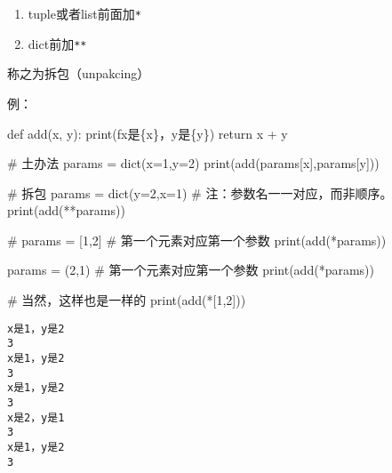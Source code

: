 \documentclass[
  letterpaper,
  DIV=11,
  numbers=noendperiod]{scrreprt}
\newenvironment{Shaded}{\begin{snugshade}}{\end{snugshade}}
\newcommand{\BuiltInTok}[1]{\textcolor[rgb]{0.00,0.23,0.31}{#1}}
\newcommand{\CommentTok}[1]{\textcolor[rgb]{0.37,0.37,0.37}{#1}}
\newcommand{\ControlFlowTok}[1]{\textcolor[rgb]{0.00,0.23,0.31}{#1}}
\newcommand{\DecValTok}[1]{\textcolor[rgb]{0.68,0.00,0.00}{#1}}
\newcommand{\KeywordTok}[1]{\textcolor[rgb]{0.00,0.23,0.31}{#1}}
\newcommand{\NormalTok}[1]{\textcolor[rgb]{0.00,0.23,0.31}{#1}}
\newcommand{\OperatorTok}[1]{\textcolor[rgb]{0.37,0.37,0.37}{#1}}
\newcommand{\SpecialCharTok}[1]{\textcolor[rgb]{0.37,0.37,0.37}{#1}}
\newcommand{\SpecialStringTok}[1]{\textcolor[rgb]{0.13,0.47,0.30}{#1}}
\newcommand{\StringTok}[1]{\textcolor[rgb]{0.13,0.47,0.30}{#1}}
\providecommand{\tightlist}{%
  \setlength{\itemsep}{0pt}\setlength{\parskip}{0pt}}\usepackage{longtable,booktabs,array}
\begin{document}
\begin{enumerate}
\def\labelenumi{\arabic{enumi}.}
\tightlist
\item
  tuple或者list前面加\texttt{*}
\item
  dict前加\texttt{**}
\end{enumerate}

称之为拆包（unpakcing）

例：

\begin{Shaded}
\begin{Highlighting}[]
\KeywordTok{def}\NormalTok{ add(x, y): }
    \BuiltInTok{print}\NormalTok{(}\SpecialStringTok{f\textquotesingle{}x是}\SpecialCharTok{\{}\NormalTok{x}\SpecialCharTok{\}}\SpecialStringTok{，y是}\SpecialCharTok{\{}\NormalTok{y}\SpecialCharTok{\}}\SpecialStringTok{\textquotesingle{}}\NormalTok{)}
    \ControlFlowTok{return}\NormalTok{ x }\OperatorTok{+}\NormalTok{ y}
    
\CommentTok{\# 土办法}
\NormalTok{params }\OperatorTok{=} \BuiltInTok{dict}\NormalTok{(x}\OperatorTok{=}\DecValTok{1}\NormalTok{,y}\OperatorTok{=}\DecValTok{2}\NormalTok{)}
\BuiltInTok{print}\NormalTok{(add(params[}\StringTok{\textquotesingle{}x\textquotesingle{}}\NormalTok{],params[}\StringTok{\textquotesingle{}y\textquotesingle{}}\NormalTok{]))}


\CommentTok{\# 拆包  }
\NormalTok{params }\OperatorTok{=} \BuiltInTok{dict}\NormalTok{(y}\OperatorTok{=}\DecValTok{2}\NormalTok{,x}\OperatorTok{=}\DecValTok{1}\NormalTok{) }\CommentTok{\# 注：参数名一一对应，而非顺序。}
\BuiltInTok{print}\NormalTok{(add(}\OperatorTok{**}\NormalTok{params))}

\CommentTok{\# }
\NormalTok{params }\OperatorTok{=}\NormalTok{ [}\DecValTok{1}\NormalTok{,}\DecValTok{2}\NormalTok{] }\CommentTok{\# 第一个元素对应第一个参数}
\BuiltInTok{print}\NormalTok{(add(}\OperatorTok{*}\NormalTok{params))}

\NormalTok{params }\OperatorTok{=}\NormalTok{ (}\DecValTok{2}\NormalTok{,}\DecValTok{1}\NormalTok{) }\CommentTok{\# 第一个元素对应第一个参数}
\BuiltInTok{print}\NormalTok{(add(}\OperatorTok{*}\NormalTok{params))}

\CommentTok{\# 当然，这样也是一样的}
\BuiltInTok{print}\NormalTok{(add(}\OperatorTok{*}\NormalTok{[}\DecValTok{1}\NormalTok{,}\DecValTok{2}\NormalTok{]))}
\end{Highlighting}
\end{Shaded}

\begin{verbatim}
x是1，y是2
3
x是1，y是2
3
x是1，y是2
3
x是2，y是1
3
x是1，y是2
3
\end{verbatim}
\end{document}
